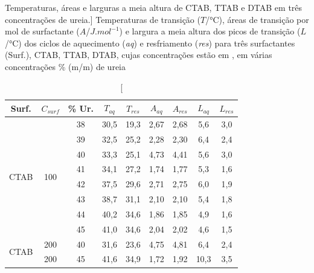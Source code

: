     \begin{table}[h]
        \IBGEtab%
        {\caption%
        	[Temperaturas, áreas e larguras a meia altura de CTAB, TTAB e DTAB em três concentrações de ureia.]%
        	{Temperaturas de transição ($T$/°C), áreas de transição por mol de surfactante ($A$/$J.mol^{-1}$) e largura a meia altura dos picos de transição ($L$/°C) dos ciclos de aquecimento (\emph{aq}) e resfriamento (\emph{res}) para três surfactantes (Surf.), CTAB, TTAB, DTAB, cujas concentrações estão em \mM, em várias concentrações \% (m/m) de ureia}
        \label{tab:DSC_temp_areas}}%
        {\begin{tabular}{ccccccccc}
        	\toprule
        	        Surf.         &      $C_{surf}$      & \% Ur. & $T_{aq}$ & $T_{res}$ & $A_{aq}$ & $A_{res}$ & $L_{aq}$ & $L_{res}$ \\ \midrule
        	\multirow{8}{*}{CTAB} & \multirow{8}{*}{100} &   38   &   30,5   &   19,3    &   2,67   &   2,68    &   5,6    &    3,0    \\
        	                      &                      &   39   &   32,5   &   25,2    &   2,28   &   2,30    &   6,4    &    2,4    \\
        	                      &                      &   40   &   33,3   &   25,1    &   4,73   &   4,41    &   5,6    &    3,0    \\
        	                      &                      &   41   &   34,1   &   27,2    &   1,74   &   1,77    &   5,3    &    1,6    \\
        	                      &                      &   42   &   37,5   &   29,6    &   2,71   &   2,75    &   6,0    &    1,9    \\
        	                      &                      &   43   &   38,7   &   31,1    &   2,10   &   2,10    &   5,4    &    1,8    \\
        	                      &                      &   44   &   40,2   &   34,6    &   1,86   &   1,85    &   4,9    &    1,6    \\
        	                      &                      &   45   &   41,0   &   34,6    &   2,04   &   2,02    &   4,6    &    1,5    \\ \midrule
        	\multirow{4}{*}{CTAB} &         200          &   40   &   31,6   &   23,6    &   4,75   &   4,81    &   6,4    &    2,4    \\
        	                      &         200          &   45   &   41,6   &   34,9    &   1,72   &   1,92    &   10,3   &    3,5    \\

\end{tabular}}
\end{table}
